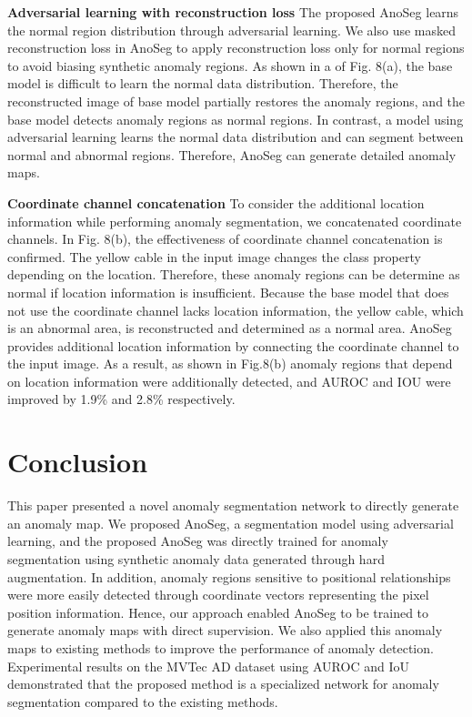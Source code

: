 \documentclass{article} \usepackage{iclr2022_conference,times}
\begin{document}
\textbf{Adversarial learning with reconstruction loss} \quad The proposed AnoSeg learns the normal region distribution through adversarial learning. We also use masked reconstruction loss in AnoSeg to apply reconstruction loss only for normal regions to avoid biasing synthetic anomaly regions. As shown in a of Fig. 8(a), the base model is difficult to learn the normal data distribution. Therefore, the reconstructed image of base model partially restores the anomaly regions, and the base model detects anomaly regions as normal regions. In contrast, a model using adversarial learning learns the normal data distribution and can segment between normal and abnormal regions. Therefore, AnoSeg can generate detailed anomaly maps.

\textbf{Coordinate channel concatenation} \quad To consider the additional location information while performing anomaly segmentation, we concatenated coordinate channels. In Fig. 8(b), the effectiveness of coordinate channel concatenation is confirmed. The yellow cable in the input image changes the class property depending on the location. Therefore, these anomaly regions can be determine as normal if location information is insufficient. Because the base model that does not use the coordinate channel lacks location information, the yellow cable, which is an abnormal area, is reconstructed and determined as a normal area. AnoSeg provides additional location information by connecting the coordinate channel to the input image. As a result, as shown in Fig.8(b) anomaly regions that depend on location information were additionally detected, and AUROC and IOU were improved by 1.9\% and 2.8\% respectively.

\section{Conclusion}
This paper presented a novel anomaly segmentation network to directly generate an anomaly map. We proposed AnoSeg, a segmentation model using adversarial learning, and the proposed AnoSeg was directly trained for anomaly segmentation using synthetic anomaly data generated through hard augmentation. In addition, anomaly regions sensitive to positional relationships were more easily detected through coordinate vectors representing the pixel position information. Hence, our approach enabled AnoSeg to be trained to generate anomaly maps with direct supervision. We also applied this anomaly maps to existing methods to improve the performance of anomaly detection. Experimental results on the MVTec AD dataset using AUROC and IoU demonstrated that the proposed method is a specialized network for anomaly segmentation compared to the existing methods.
\end{document}
